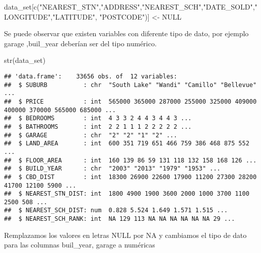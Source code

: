 \documentclass[
]{article}
\newenvironment{Shaded}{\begin{snugshade}}{\end{snugshade}}
\newcommand{\ConstantTok}[1]{\textcolor[rgb]{0.00,0.00,0.00}{#1}}
\newcommand{\FunctionTok}[1]{\textcolor[rgb]{0.00,0.00,0.00}{#1}}
\newcommand{\NormalTok}[1]{#1}
\newcommand{\OtherTok}[1]{\textcolor[rgb]{0.56,0.35,0.01}{#1}}
\newcommand{\StringTok}[1]{\textcolor[rgb]{0.31,0.60,0.02}{#1}}
\begin{document}
\begin{Shaded}
\begin{Highlighting}[]
\NormalTok{data\_set[}\FunctionTok{c}\NormalTok{(}\StringTok{"NEAREST\_STN"}\NormalTok{,}\StringTok{"ADDRESS"}\NormalTok{,}\StringTok{"NEAREST\_SCH"}\NormalTok{,}\StringTok{"DATE\_SOLD"}\NormalTok{,}\StringTok{"LONGITUDE"}\NormalTok{,}\StringTok{"LATITUDE"}\NormalTok{, }\StringTok{"POSTCODE"}\NormalTok{)] }\OtherTok{\textless{}{-}} \ConstantTok{NULL}
\end{Highlighting}
\end{Shaded}

Se puede observar que existen variables con diferente tipo de dato, por
ejemplo garage ,buil\_year deberían ser del tipo numérico.

\begin{Shaded}
\begin{Highlighting}[]
\FunctionTok{str}\NormalTok{(data\_set)}
\end{Highlighting}
\end{Shaded}

\begin{verbatim}
## 'data.frame':    33656 obs. of  12 variables:
##  $ SUBURB          : chr  "South Lake" "Wandi" "Camillo" "Bellevue" ...
##  $ PRICE           : int  565000 365000 287000 255000 325000 409000 400000 370000 565000 685000 ...
##  $ BEDROOMS        : int  4 3 3 2 4 4 3 4 4 3 ...
##  $ BATHROOMS       : int  2 2 1 1 1 2 2 2 2 2 ...
##  $ GARAGE          : chr  "2" "2" "1" "2" ...
##  $ LAND_AREA       : int  600 351 719 651 466 759 386 468 875 552 ...
##  $ FLOOR_AREA      : int  160 139 86 59 131 118 132 158 168 126 ...
##  $ BUILD_YEAR      : chr  "2003" "2013" "1979" "1953" ...
##  $ CBD_DIST        : int  18300 26900 22600 17900 11200 27300 28200 41700 12100 5900 ...
##  $ NEAREST_STN_DIST: int  1800 4900 1900 3600 2000 1000 3700 1100 2500 508 ...
##  $ NEAREST_SCH_DIST: num  0.828 5.524 1.649 1.571 1.515 ...
##  $ NEAREST_SCH_RANK: int  NA 129 113 NA NA NA NA NA NA 29 ...
\end{verbatim}

Remplazamos los valores en letras NULL por NA y cambiamos el tipo de
dato para las columnas buil\_year, garage a numéricas
\end{document}
